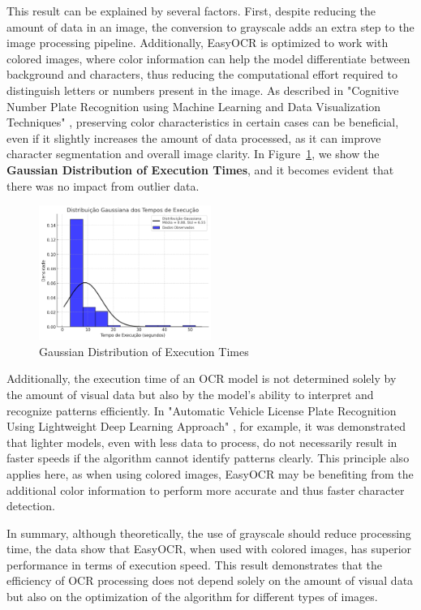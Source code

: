 \documentclass[conference]{IEEEtran}
\begin{document}
	This result can be explained by several factors. First, despite reducing the amount of data in an image, the conversion to grayscale adds an extra step to the image processing pipeline. Additionally, EasyOCR is optimized to work with colored images, where color information can help the model differentiate between background and characters, thus reducing the computational effort required to distinguish letters or numbers present in the image. As described in "Cognitive Number Plate Recognition using Machine Learning and Data Visualization Techniques" \cite{b6}, preserving color characteristics in certain cases can be beneficial, even if it slightly increases the amount of data processed, as it can improve character segmentation and overall image clarity. In Figure~\ref{img9}, we show the \textbf{Gaussian Distribution of Execution Times}, and it becomes evident that there was no impact from outlier data.
	
	\begin{figure}[htbp]
		\centerline{\includegraphics[width=0.5\textwidth]{img9.png}}
		\caption{Gaussian Distribution of Execution Times}
		\label{img9}
	\end{figure}
	
	Additionally, the execution time of an OCR model is not determined solely by the amount of visual data but also by the model's ability to interpret and recognize patterns efficiently. In "Automatic Vehicle License Plate Recognition Using Lightweight Deep Learning Approach" \cite{b5}, for example, it was demonstrated that lighter models, even with less data to process, do not necessarily result in faster speeds if the algorithm cannot identify patterns clearly. This principle also applies here, as when using colored images, EasyOCR may be benefiting from the additional color information to perform more accurate and thus faster character detection.
	
	In summary, although theoretically, the use of grayscale should reduce processing time, the data show that EasyOCR, when used with colored images, has superior performance in terms of execution speed. This result demonstrates that the efficiency of OCR processing does not depend solely on the amount of visual data but also on the optimization of the algorithm for different types of images.
	
\end{document}
